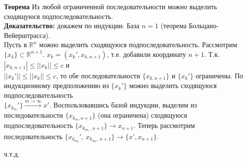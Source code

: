 \documentclass[book, 11pt]{report}
\begin{document}
        \vspace{0.4cm}
        \par{\textbf{Теорема }Из любой ограниченной последовательности можно выделить сходящуюся подпоследовательность. \\
        \textbf{Доказательство: }докажем по индукции. База $n=1$ (теорема Больцано-Вейерштрасса). \\
        Пусть в $\mathbb{R}^n$ можно выделить сходящуюся подпоследовательность. Рассмотрим $\{x_k\}\subset\mathbb{R}^{n+1}$. $x_k=(x_k',x_{k,n+1})$, т.е. добавили координату $n+1$. Т.к. $|x_{k,n+1}|\leq||x_k||\leq c$ и\\ $||x_k'||\leq||x_k||\leq c$, то обе последовательности $\{x_{k,n+1}\}$ и $\{x_k'\}$ ограничены. По индукционному предположению из $\{x_k'\}$ можно выделить сходящуюся подпоследовательность\\ $\{x_{k_m}'\}\xrightarrow{m\to\infty}x'$. Воспользовавшись базой индукции, выделим из последовательности $\{x_{k_m,n+1}\}$ (она ограничена) сходящуюся подпоследовательность $\{x_{k_{m_l} \ ,n+1}\}\to x_{n+1}$. Теперь рассмотрим последовательность $\{x_{k_{m_l}}', \ x_{k_{m_l} , \ n+1}\}\to\{x',x_{n+1}\}$. 
        }
        \par{{\raggedleft ч.т.д.\par}}
        \vspace{0.6cm}
\end{document}
